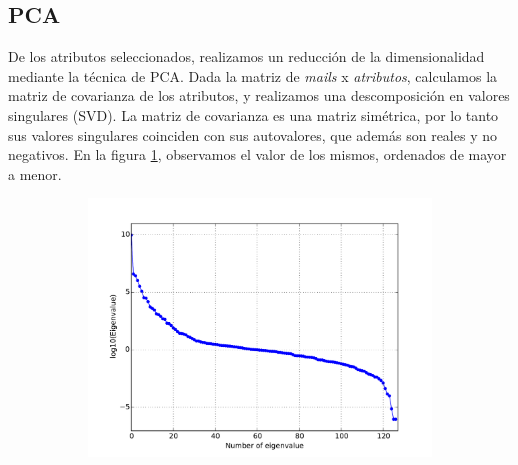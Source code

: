 \documentclass[a4paper,10pt]{article}
\begin{document}
\subsection{PCA}

\par De los atributos seleccionados, realizamos un reducción de la dimensionalidad
mediante la técnica de PCA. Dada la matriz de \emph{mails} x \emph{atributos},
calculamos la matriz de covarianza de los atributos, y realizamos una descomposición en valores singulares (SVD). La matriz de covarianza es una matriz simétrica, por lo tanto sus valores singulares coinciden con sus autovalores, que además son reales y no negativos. En la figura \ref{fig:autovalores}, observamos el valor de los mismos, ordenados de mayor a menor. 
  \begin{figure}[H]
    \centering
    \begin{subfigure}[b]{0.4\textwidth}
      \includegraphics[width=\textwidth]{../imagenes/Autovalores}
      \caption{}
    \end{subfigure}
    \label{fig:autovalores}
  \end{figure}
\end{document}
